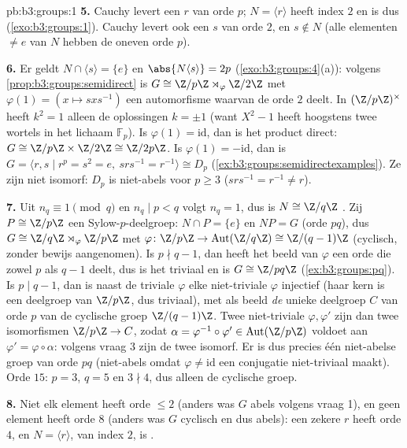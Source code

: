 \begin{solution}{pb:b3:groups:1}
\textbf{5.} Cauchy levert een $r$ van orde $p$; $N = \langle r
\rangle$ heeft index $2$ en is dus 
(\cref{exo:b3:groups:1}). Cauchy levert ook een $s$ van orde $2$,
en $s \notin N$ (alle elementen $\neq e$ van $N$ hebben de oneven
orde $p$).

\textbf{6.} Er geldt $N \cap \langle s \rangle = \{e\}$ en
$\abs{N\langle s\rangle} = 2p$ (\cref{exo:b3:groups:4}(a)): volgens
\cref{prop:b3:groups:semidirect} is $G \cong \Z/p\Z \rtimes_\varphi
\Z/2\Z$ met $\varphi(1) = (x \mapsto sxs^{-1})$ een automorfisme
waarvan de orde $2$ deelt. In $(\Z/p\Z)^\times$ heeft $k^2 = 1$
alleen de oplossingen $k = \pm 1$ (want $X^2 - 1$ heeft hoogstens
twee wortels in het lichaam $\mathbb F_p$). Is $\varphi(1) =
\mathrm{id}$, dan is het product direct: $G \cong \Z/p\Z \times
\Z/2\Z \cong \Z/2p\Z$. Is $\varphi(1) = -\mathrm{id}$, dan is $G =
\langle r, s \mid r^p = s^2 = e,\ srs^{-1} = r^{-1}\rangle \cong
D_p$ (\cref{ex:b3:groups:semidirectexamples}). Ze zijn niet
isomorf: $D_p$ is niet-abels voor $p \geq 3$ ($srs^{-1} = r^{-1}
\neq r$).

\textbf{7.} Uit $n_q \equiv 1 \pmod q$ en $n_q \mid p < q$ volgt
$n_q = 1$, dus is $N \cong \Z/q\Z$ . Zij $P \cong \Z/p\Z$
een Sylow-$p$-deelgroep: $N \cap P = \{e\}$ en $NP = G$ (orde
$pq$), dus $G \cong \Z/q\Z \rtimes_\varphi \Z/p\Z$ met $\varphi
\colon \Z/p\Z \to \operatorname{Aut}(\Z/q\Z) \cong \Z/(q-1)\Z$
(cyclisch, zonder bewijs aangenomen). Is $p \nmid q - 1$, dan heeft
het beeld van $\varphi$ een orde die zowel $p$ als $q-1$ deelt, dus
is het triviaal en is $G \cong \Z/pq\Z$
(\cref{ex:b3:groups:pq}). Is $p \mid q - 1$, dan is naast de
triviale $\varphi$ elke niet-triviale $\varphi$ injectief (haar
kern is een deelgroep van $\Z/p\Z$, dus triviaal), met als beeld
\emph{de} unieke deelgroep $C$ van orde $p$ van de cyclische groep
$\Z/(q-1)\Z$. Twee niet-triviale  $\varphi, \varphi'$ zijn
dan twee isomorfismen $\Z/p\Z \to C$, zodat $\alpha =
\varphi^{-1}\circ\varphi' \in \operatorname{Aut}(\Z/p\Z)$ voldoet
aan $\varphi' = \varphi\circ\alpha$: volgens vraag 3 zijn de twee
 isomorf. Er is dus precies één niet-abelse
groep van orde $pq$ (niet-abels omdat $\varphi \neq \mathrm{id}$
een conjugatie niet-triviaal maakt). Orde $15$: $p = 3$, $q = 5$ en
$3 \nmid 4$, dus alleen de cyclische groep.

\textbf{8.} Niet elk element heeft orde $\leq 2$ (anders was $G$
abels volgens vraag 1), en geen element heeft orde $8$ (anders was
$G$ cyclisch en dus abels): een zekere $r$ heeft orde $4$, en $N =
\langle r\rangle$, van index $2$, is .


\end{solution}
